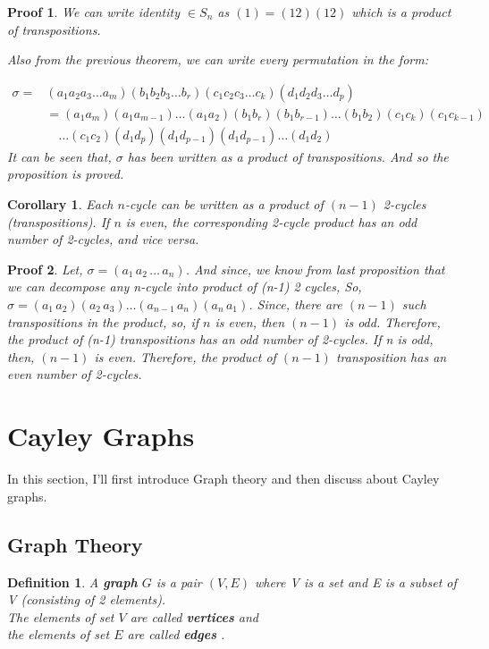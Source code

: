 \documentclass[12pt,a4paper]{article}
\theoremstyle{custom}
\newtheorem*{definition}{Definition}
\newtheorem*{corollary}{Corollary}
\newtheorem*{proofcustom}{Proof}
\begin{document}
\begin{proofcustom}
    We can write identity $\in S_n$ as $(1)=(12)(12)$ which is a product of transpositions.

    Also from the previous theorem, we can write every permutation in the form:
 
\begin{align*}
\sigma = &(a_1a_2a_3\dots a_m)(b_1b_2b_3\dots b_r)(c_1c_2c_3\dots c_k)(d_1d_2d_3\dots d_p) \\
&= (a_1a_m)(a_1a_{m-1})\dots(a_1a_2)(b_1b_r)(b_1b_{r-1})\dots(b_1b_2)(c_1c_k)(c_1c_{k-1}) \\
&\quad\dots(c_1c_2)(d_1d_p)(d_1d_{p-1})(d_1d_{p-1})\dots(d_1d_2)
\end{align*}
 It can be seen that, $\sigma$ has been written as a product of transpositions. And so the proposition is proved. 


\end{proofcustom}

\begin{corollary}
    Each $n$-cycle can be written as a product of $(n-1)$ 2-cycles (transpositions). If $n$ is even, the corresponding 2-cycle product has an odd number of 2-cycles, and vice versa.
\end{corollary}

\begin{proofcustom}
    Let, $\sigma= (a_1 \, a_2 \, \ldots \, a_n)$. And since, we know from last proposition that we can decompose any n-cycle into product of (n-1) 2 cycles, So, $\sigma = (a_1 \, a_2)(a_2 \, a_3) \ldots (a_{n-1} \, a_n)(a_n \, a_1)$. Since, there are $(n-1)$ such transpositions in the product, so,
if  $n$ is even, then $(n-1)$ is odd. Therefore, the product of (n-1) transpositions has an odd number of 2-cycles.
If n is odd, then, $(n-1)$ is even. Therefore, the product of $( n-1)$ transposition has an even number of 2-cycles.
\end{proofcustom}
\newpage
\section{Cayley Graphs}\label{cayley}

In this section, I'll first introduce Graph theory and then discuss about Cayley graphs. 


\subsection*{Graph Theory}
\begin{definition}
    A \textbf{graph} $G$ is a pair $(V, E)$ where V is a set and E is a subset of V (consisting of 2 elements).\\
The elements of set $V$ are called \textbf{vertices} and\\ the elements of set $E$ are called \textbf{edges} \cite{Tripi2017CayleyGO}.    
\end{definition}
\end{document}
